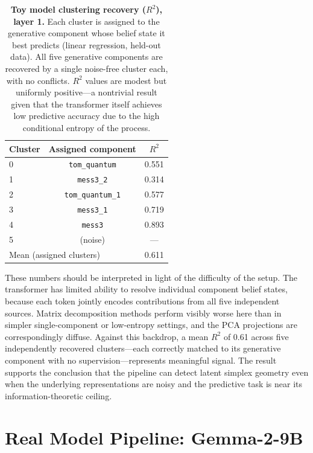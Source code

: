 \documentclass{article}
\begin{document}
\begin{table}[t]
  \centering
  \caption{%
    \textbf{Toy model clustering recovery ($R^2$), layer 1.}
    Each cluster is assigned to the generative component whose belief state it best
    predicts (linear regression, held-out data).  All five generative components are
    recovered by a single noise-free cluster each, with no conflicts.  $R^2$ values
    are modest but uniformly positive---a nontrivial result given that the
    transformer itself achieves low predictive accuracy due to the high conditional
    entropy of the process.
  }
  \label{tab:toy_r2}
  \small
  \begin{tabular}{lcc}
    \toprule
    Cluster & Assigned component & $R^2$ \\
    \midrule
    0 & \texttt{tom\_quantum}    & 0.551 \\
    1 & \texttt{mess3\_2}        & 0.314 \\
    2 & \texttt{tom\_quantum\_1} & 0.577 \\
    3 & \texttt{mess3\_1}        & 0.719 \\
    4 & \texttt{mess3}           & 0.893 \\
    5 & (noise)                  & ---   \\
    \midrule
    \multicolumn{2}{l}{Mean (assigned clusters)} & 0.611 \\
    \bottomrule
  \end{tabular}
\end{table}

These numbers should be interpreted in light of the difficulty of the setup.
The transformer has limited ability to resolve individual component belief states,
because each token jointly encodes contributions from all five independent sources.
Matrix decomposition methods perform visibly worse here than in simpler
single-component or low-entropy settings, and the PCA projections are correspondingly
diffuse.  Against this backdrop, a mean $R^2$ of 0.61 across five independently
recovered clusters---each correctly matched to its generative component with no
supervision---represents meaningful signal.  The result supports the conclusion that
the pipeline can detect latent simplex geometry even when the underlying
representations are noisy and the predictive task is near its information-theoretic
ceiling.

\section{Real Model Pipeline: Gemma-2-9B}
\label{sec:real}
\end{document}
